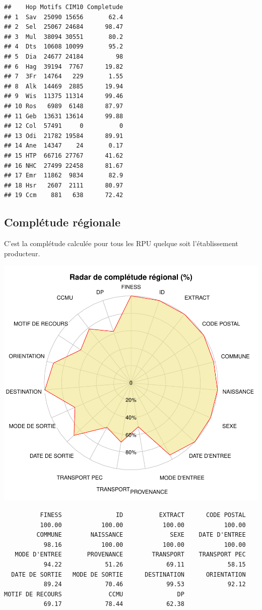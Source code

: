 \documentclass[]{article}
\begin{document}
\begin{verbatim}
##    Hop Motifs CIM10 Completude
## 1  Sav  25090 15656       62.4
## 2  Sel  25067 24684      98.47
## 3  Mul  38094 30551       80.2
## 4  Dts  10608 10099       95.2
## 5  Dia  24677 24184         98
## 6  Hag  39194  7767      19.82
## 7  3Fr  14764   229       1.55
## 8  Alk  14469  2885      19.94
## 9  Wis  11375 11314      99.46
## 10 Ros   6989  6148      87.97
## 11 Geb  13631 13614      99.88
## 12 Col  57491     0          0
## 13 Odi  21782 19584      89.91
## 14 Ane  14347    24       0.17
## 15 HTP  66716 27767      41.62
## 16 NHC  27499 22458      81.67
## 17 Emr  11862  9834       82.9
## 18 Hsr   2607  2111      80.97
## 19 Ccm    881   638      72.42
\end{verbatim}

\subsection{Complétude régionale}\label{completude-regionale}

C'est la complétude calculée pour tous les RPU quelque soit
l'établissement producteur.

\includegraphics{completude_files/figure-latex/comp_regionale-1.pdf}

\begin{verbatim}
          FINESS               ID          EXTRACT      CODE POSTAL 
          100.00           100.00           100.00           100.00 
         COMMUNE        NAISSANCE             SEXE    DATE D'ENTREE 
           98.16           100.00           100.00           100.00 
   MODE D'ENTREE       PROVENANCE        TRANSPORT    TRANSPORT PEC 
           94.22            51.26            69.11            58.15 
  DATE DE SORTIE   MODE DE SORTIE      DESTINATION      ORIENTATION 
           89.24            70.46            99.53            92.12 
MOTIF DE RECOURS             CCMU               DP 
           69.17            78.44            62.38 
\end{verbatim}
\end{document}
